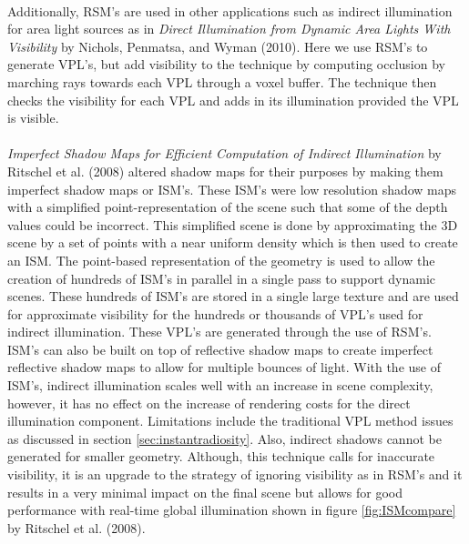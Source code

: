 \paragraph{}
Additionally, RSM's are used in other applications such as indirect illumination for area light sources as in \textit{Direct Illumination from Dynamic Area Lights With Visibility} by Nichols, Penmatsa, and Wyman (2010).  Here we use RSM's to generate VPL's, but add visibility to the technique by computing occlusion by marching rays towards each VPL through a voxel buffer.  The technique then checks the visibility for each VPL and adds in its illumination provided the VPL is visible.

\paragraph{}
\textit{Imperfect Shadow Maps for Efficient Computation of Indirect Illumination} by Ritschel et al. (2008) altered shadow maps for their purposes by making them imperfect shadow maps or ISM's.  These ISM's were low resolution shadow maps with a simplified point-representation of the scene such that some of the depth values could be incorrect.  This simplified scene is done by approximating the 3D scene by a set of points with a near uniform density which is then used to create an ISM.  The point-based representation of the geometry is used to allow the creation of hundreds of ISM's in parallel in a single pass to support dynamic scenes.  These hundreds of ISM's are stored in a single large texture and are used for approximate visibility for the hundreds or thousands of VPL's used for indirect illumination.  These VPL's are generated through the use of RSM's.  ISM's can also be built on top of reflective shadow maps to create imperfect reflective shadow maps to allow for multiple bounces of light.  With the use of ISM's, indirect illumination scales well with an increase in scene complexity, however, it has no effect on the increase of rendering costs for the direct illumination component.  Limitations include the traditional VPL method issues as discussed in section \ref{sec:instantradiosity}.  Also, indirect shadows cannot be generated for smaller geometry.  Although, this technique calls for inaccurate visibility, it is an upgrade to the strategy of ignoring visibility as in RSM's and it results in a very minimal impact on the final scene but allows for good performance with real-time global illumination shown in figure \ref{fig:ISMcompare} by Ritschel et al. (2008).

